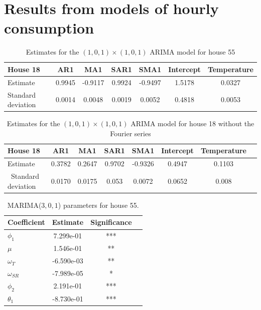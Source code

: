 \section{Results from models of hourly consumption}
\begin{table}[H]
    \begin{tabular}{l|cccccc}
    \hline
    House 18           & AR1    & MA1     & SAR1   & SMA1    & Intercept & Temperature \\ \hline\hline
    Estimate           & 0.9945 & -0.9117 & 0.9924 & -0.9497 & 1.5178    & 0.0327      \\ 
    Standard deviation & 0.0014 & 0.0048  & 0.0019 & 0.0052  & 0.4818    & 0.0053      \\ \hline
    \end{tabular}
    \caption{Estimates for the $(1,0,1)\times(1,0,1)$ ARIMA model for house 55}
    \label{tab:model1_param55}
    \end{table}
\begin{table}
    \begin{tabular}{l|ccccccc}
    \hline
    House 18           & AR1    & MA1    & SAR1   & SMA1    & Intercept & Temperature \\ \hline \hline
    Estimate           & 0.3782 & 0.2647 & 0.9702 & -0.9326 & 0.4947    & 0.1103      \\ \
    Standard deviation & 0.0170 & 0.0175 & 0.053  & 0.0072  & 0.0652    & 0.008       \\ \hline
    \end{tabular}
    \caption{Estimates for the $(1,0,1)\times(1,0,1)$ ARIMA model for house 18 without the Fourier series}
    \label{tab:model1_param18}
    \end{table}
    \begin{table}
        \centering
        \begin{tabular}{l|ccc}
        \hline
        Coefficient & Estimate & Significance\\ \hline \hline
        $\phi_1$ & 7.299e-01 & *** \\
        $\mu$ & 1.546e-01 & ** \\
        $\omega_{T}$ & -6.590e-03 & ** \\
        $\omega_{SR}$ & -7.989e-05 & * \\
        $\phi_2$ & 2.191e-01 &  *** \\
        $\theta_1$ & -8.730e-01 & *** \\
        \hline
        \end{tabular}
        \caption{MARIMA($3,0,1$) parameters for house 55.}
        \label{tab: MARIMAparam55}
     \end{table}

